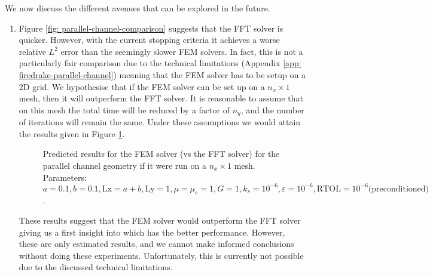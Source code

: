 \documentclass[12pt]{article}
\theoremstyle{theorem}
\begin{document}
We now discuss the different avenues that can be explored in the future.

\begin{enumerate}
    \item Figure \ref{fig: parallel-channel-comparison} suggests that the FFT solver is quicker. However, with the current stopping criteria it achieves a worse relative $L^2$ error than the seemingly slower FEM solvers. In fact, this is not a particularly fair comparison due to the technical limitations (Appendix \ref{app: firedrake-parallel-channel}) meaning that the FEM solver has to be setup on a 2D grid. We hypothesise that if the FEM solver can be set up on a $n_x \times 1$ mesh, then it will outperform the FFT solver. It is reasonable to assume that on this mesh the total time will be reduced by a factor of $n_y$, and the number of iterations will remain the same. Under these assumptions we would attain the results given in Figure \ref{fig: pc_new}.
    
    \begin{figure}[H]
        \centering
      
        \hfill
      
        \caption{Predicted results for the FEM solver (vs the FFT solver) for the parallel channel geometry if it were run on a $n_x \times 1$ mesh. Parameters: $a = 0.1, b=0.1, \mathrm{Lx} = a+b, \mathrm{Ly}=1, \mu=\mu_e=1, G=1, k_s = 10^{-6}, \varepsilon = 10^{-6}, \mathrm{RTOL} = 10^{-6} \text{(preconditioned)}$.}
        \label{fig: pc_new} 
    \end{figure}

    These results suggest that the FEM solver would outperform the FFT solver giving us a first insight into which has the better performance. However, these are only estimated results, and we cannot make informed conclusions without doing these experiments. Unfortunately, this is currently not possible due to the discussed technical limitations.


\end{enumerate}
\end{document}
